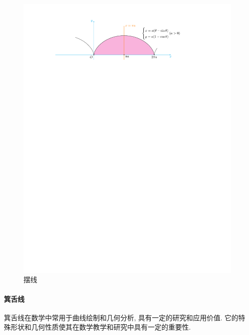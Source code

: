 \begin{figure}[H]
    \centering
    \includegraphics{figures/Cycloid.pdf}
    \caption{摆线}
    \label{cycloid}
\end{figure}

\paragraph{箕舌线}

箕舌线在数学中常用于曲线绘制和几何分析, 具有一定的研究和应用价值. 它的特殊形状和几何性质使其在数学教学和研究中具有一定的重要性. 

